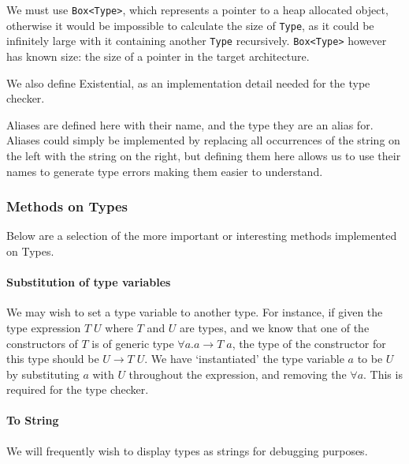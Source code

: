 We must use \verb|Box<Type>|, which represents a pointer to a heap allocated object, otherwise it would be impossible to calculate the size of \verb|Type|, as it could be infinitely large with it containing another \verb|Type| recursively. \verb|Box<Type>| however has known size: the size of a pointer in the target architecture. 

We also define Existential, as an implementation detail needed for the type checker. 

Aliases are defined here with their name, and the type they are an alias for. Aliases could simply be implemented by replacing all occurrences of the string on the left with the string on the right, but defining them here allows us to use their names to generate type errors making them easier to understand. 

\subsubsection{Methods on Types}
Below are a selection of the more important or interesting methods implemented on Types.

\paragraph{Substitution of type variables} We may wish to set a type variable to another type. For instance, if given the type expression \(T \; U\) where \(T\) and \(U\) are types, and we know that one of the constructors of \(T\) is of generic type \(\forall a.a \rightarrow T \; a\), the type of the constructor for this type should be \(U \rightarrow T \; U\). We have `instantiated' the type variable \(a\) to be \(U\) by substituting \(a\) with \(U\) throughout the expression, and removing the \(\forall a\). This is required for the type checker. 

\paragraph{To String} We will frequently wish to display types as strings for debugging purposes. 

